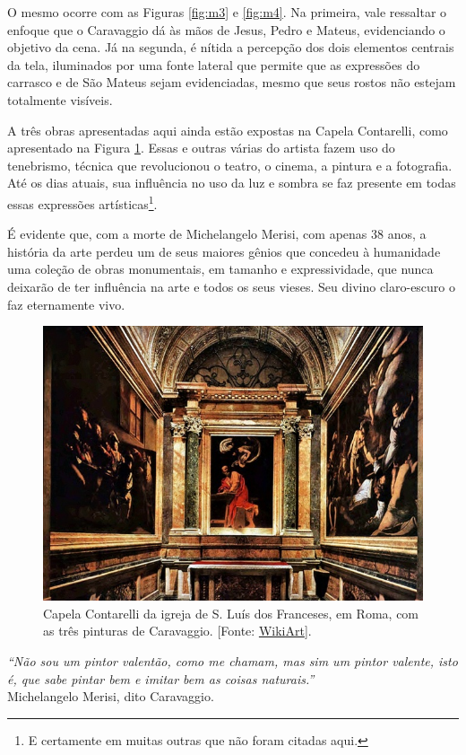 \begin{multicols}{2}
    
O mesmo ocorre com as Figuras \ref{fig:m3} e \ref{fig:m4}. Na primeira, vale ressaltar o enfoque que o Caravaggio dá às mãos de Jesus, Pedro e Mateus, evidenciando o objetivo da cena. Já na segunda, é nítida a percepção dos dois elementos centrais da tela, iluminados por uma fonte lateral que permite que as expressões do carrasco e de São Mateus sejam evidenciadas, mesmo que seus rostos não estejam totalmente visíveis. 
	
A três obras apresentadas aqui ainda estão expostas na Capela Contarelli, como apresentado na Figura \ref{fig:m5}. Essas e outras várias do artista fazem uso do tenebrismo, técnica que revolucionou o teatro, o cinema, a pintura e a fotografia. Até os dias atuais, sua influência no uso da luz e sombra se faz presente em todas essas expressões artísticas\footnote{E certamente em muitas outras que não foram citadas aqui.}. 
	
É evidente que, com a morte de Michelangelo Merisi, com apenas 38 anos, a história da arte perdeu um de seus maiores gênios que concedeu à humanidade uma coleção de obras monumentais, em tamanho e expressividade, que nunca deixarão de ter influência na arte e todos os seus vieses. Seu divino claro-escuro o faz eternamente vivo. 

\begin{figure}[H]
	\centering
	\includegraphics[width=0.95\linewidth]{Figuras/Artigo2/m8.jpg}
	\protect\caption{Capela Contarelli da igreja de S. Luís dos Franceses, em Roma, com as três pinturas de Caravaggio. [Fonte: \href{https://pt.wikipedia.org/wiki/A_Inspira\%C3\%A7\%C3\%A3o\_de\_S\%C3\%A3o\_Mateus\#/media/Ficheiro:1475RomaSLuigiFrancesiInside.jpg}{WikiArt}].}
	\label{fig:m5}
\end{figure}

\noindent\textit{``Não sou um pintor valentão, como me chamam, mas sim um pintor valente, isto é, que sabe pintar bem e imitar bem as coisas naturais.''}\\
	Michelangelo Merisi, dito Caravaggio.


\end{multicols}

